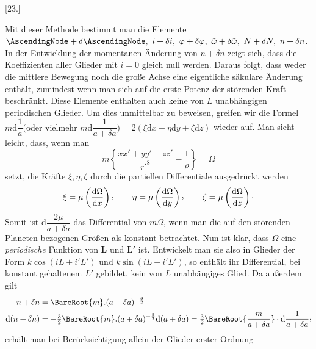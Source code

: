 \par{}\bigskip
{}
\begin{center}[23.]\end{center}
\begingroup
\setlength{\lineskip}{4pt}\setlength{\lineskiplimit}{4pt}
\noindent\hspace*{\parindent}Mit dieser Methode bestimmt man die Elemente \(\AscendingNode+\delta\AscendingNode,\ i+\delta i,\ \varphi+\delta\varphi,\ \tilde\omega+\delta\tilde\omega,\ N+\delta N,\ n+\delta n\). In der Entwicklung der momentanen Änderung von \(n+\delta n\) zeigt sich, dass die Koeffizienten aller Glieder mit \(i=0\) gleich null werden. Daraus folgt, dass weder die mittlere Bewegung noch die große Achse eine eigentliche säkulare Änderung enthält, zumindest wenn man sich auf die erste Potenz der störenden Kraft beschränkt. Diese Elemente enthalten auch keine von \(L\) unabhängigen periodischen Glieder. Um dies unmittelbar zu beweisen, greifen wir die Formel \(m\mathrm{d}\dfrac{1}{a}\bigl(\text{oder vielmehr }m\mathrm{d}\dfrac{1}{a+\delta a}\bigr)=2(\xi\mathrm{d}x+\eta\mathrm{d}y+\zeta\mathrm{d}z)\) wieder auf. Man sieht leicht, dass, wenn man
\[
m\left\{\frac{xx'+yy'+zz'}{r'^{8}}-\frac{1}{\rho}\right\}=\Omega
\]
setzt, die Kräfte \(\xi,\eta,\zeta\) durch die partiellen Differentiale ausgedrückt werden
\[
\xi=\mu\left(\frac{\mathrm{d}\Omega}{\mathrm{d}x}\right)\mathpunct{\raisebox{.45ex}{,}}\qquad
\eta=\mu\left(\frac{\mathrm{d}\Omega}{\mathrm{d}y}\right)\mathpunct{\raisebox{.45ex}{,}}\qquad
\zeta=\mu\left(\frac{\mathrm{d}\Omega}{\mathrm{d}z}\right)\mathpunct{\cdot}
\]
Somit ist \(\mathrm{d}\dfrac{2\mu}{a+\delta a}\) das Differential von \(m\Omega\), wenn man die auf den störenden Planeten bezogenen Größen als konstant betrachtet. Nun ist klar, dass \(\Omega\) eine \textit{periodische} Funktion von \(\boldsymbol{L}\) und \(\boldsymbol{L}'\) ist. Entwickelt man sie also in Glieder der Form \(k\cos(iL+i'L')\) und \(k\sin(iL+i'L')\), so enthält ihr Differential, bei konstant gehaltenem \(L'\) gebildet, kein von \(L\) unabhängiges Glied. Da außerdem gilt
\[
\begin{aligned}
n+\delta n&=\BareRoot{m}.(a+\delta a)^{-\frac{3}{2}}\\
\mathrm{d}(n+\delta n)&=-\tfrac{3}{2}\BareRoot{m}.(a+\delta a)^{-\frac{5}{2}}\mathrm{d}(a+\delta a)=\tfrac{3}{2}\BareRoot{\dfrac{m}{a+\delta a}}\cdot\mathrm{d}\frac{1}{a+\delta a}\mathpunct{\raisebox{.45ex}{,}}
\end{aligned}
\]
erhält man bei Berücksichtigung allein der Glieder erster Ordnung
